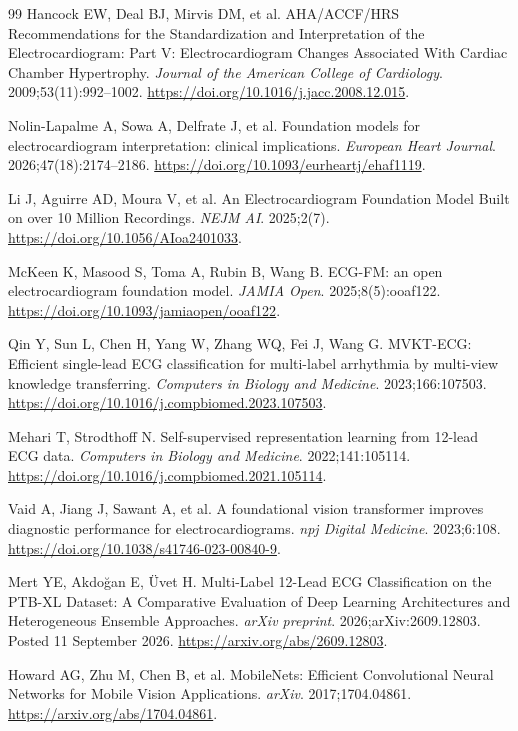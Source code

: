 \documentclass[11pt,a4paper,UTF8,fontset=windows]{ctexart}
\begin{document}
\begin{thebibliography}{99}
 Hancock EW, Deal BJ, Mirvis DM, et al. AHA/ACCF/HRS Recommendations for the Standardization and Interpretation of the Electrocardiogram: Part V: Electrocardiogram Changes Associated With Cardiac Chamber Hypertrophy. \emph{Journal of the American College of Cardiology}. 2009;53(11):992--1002. \url{https://doi.org/10.1016/j.jacc.2008.12.015}.

 Nolin-Lapalme A, Sowa A, Delfrate J, et al. Foundation models for electrocardiogram interpretation: clinical implications. \emph{European Heart Journal}. 2026;47(18):2174--2186. \url{https://doi.org/10.1093/eurheartj/ehaf1119}.

 Li J, Aguirre AD, Moura V, et al. An Electrocardiogram Foundation Model Built on over 10 Million Recordings. \emph{NEJM AI}. 2025;2(7). \url{https://doi.org/10.1056/AIoa2401033}.

 McKeen K, Masood S, Toma A, Rubin B, Wang B. ECG-FM: an open electrocardiogram foundation model. \emph{JAMIA Open}. 2025;8(5):ooaf122. \url{https://doi.org/10.1093/jamiaopen/ooaf122}.

 Qin Y, Sun L, Chen H, Yang W, Zhang WQ, Fei J, Wang G. MVKT-ECG: Efficient single-lead ECG classification for multi-label arrhythmia by multi-view knowledge transferring. \emph{Computers in Biology and Medicine}. 2023;166:107503. \url{https://doi.org/10.1016/j.compbiomed.2023.107503}.

 Mehari T, Strodthoff N. Self-supervised representation learning from 12-lead ECG data. \emph{Computers in Biology and Medicine}. 2022;141:105114. \url{https://doi.org/10.1016/j.compbiomed.2021.105114}.

 Vaid A, Jiang J, Sawant A, et al. A foundational vision transformer improves diagnostic performance for electrocardiograms. \emph{npj Digital Medicine}. 2023;6:108. \url{https://doi.org/10.1038/s41746-023-00840-9}.

 Mert YE, Akdo\u{g}an E, \"{U}vet H. Multi-Label 12-Lead ECG Classification on the PTB-XL Dataset: A Comparative Evaluation of Deep Learning Architectures and Heterogeneous Ensemble Approaches. \emph{arXiv preprint}. 2026;arXiv:2609.12803. Posted 11 September 2026. \url{https://arxiv.org/abs/2609.12803}.

 Howard AG, Zhu M, Chen B, et al. MobileNets: Efficient Convolutional Neural Networks for Mobile Vision Applications. \emph{arXiv}. 2017;1704.04861. \url{https://arxiv.org/abs/1704.04861}.


\end{thebibliography}
\end{document}
